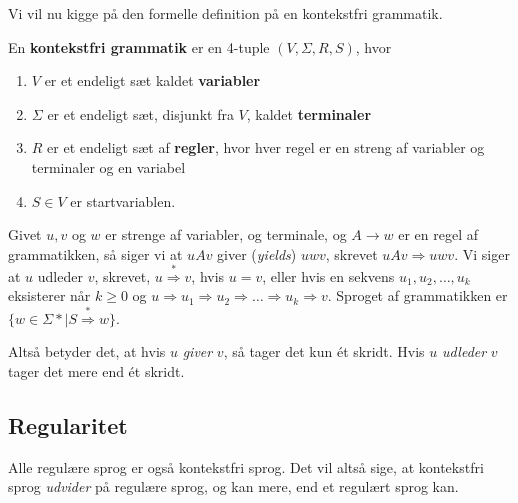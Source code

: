 Vi vil nu kigge på den formelle definition på en kontekstfri grammatik.

\begin{definition}
  En \textbf{kontekstfri grammatik}   er en 4-tuple $(V, \Sigma, R, S)$, hvor
  \begin{enumerate}
    \item $V$ er et endeligt sæt kaldet \textbf{variabler}
    \item $\Sigma$ er et endeligt sæt, disjunkt fra $V$, kaldet \textbf{terminaler}
    \item $R$ er et endeligt sæt af \textbf{regler}, hvor hver regel er en streng af variabler og terminaler og en variabel
    \item $S \in V$ er startvariablen.
  \end{enumerate}

\end{definition}

Givet $u, v$ og $w$ er strenge af variabler, og terminale, og $A \rightarrow w$ er en regel af grammatikken, så siger vi at $uAv$ giver (\textit{yields}) $uwv$, skrevet $uAv \Rightarrow uwv$. Vi siger at $u$ udleder $v$, skrevet, $u \stackrel{*}{\Rightarrow} v$, hvis $u = v$, eller hvis en sekvens $u_{1}, u_{2}, \ldots, u_{k}$ eksisterer når $k \geq 0$ og $u \Rightarrow u_{1} \Rightarrow u_{2} \Rightarrow \ldots \Rightarrow u_{k} \Rightarrow v$. Sproget af grammatikken er $\{w \in \Sigma* | S \stackrel{*}{\Rightarrow} w\}$.

Altså betyder det, at hvis $u$ \textit{giver} $v$, så tager det kun ét skridt. Hvis $u$ \textit{udleder} $v$ tager det mere end ét skridt.


\newpage

\subsection{Regularitet}%
\label{subsec:cflregularity}

Alle regulære sprog er også kontekstfri sprog. Det vil altså sige, at kontekstfri sprog \textit{udvider} på regulære sprog, og kan mere, end et regulært sprog kan.

